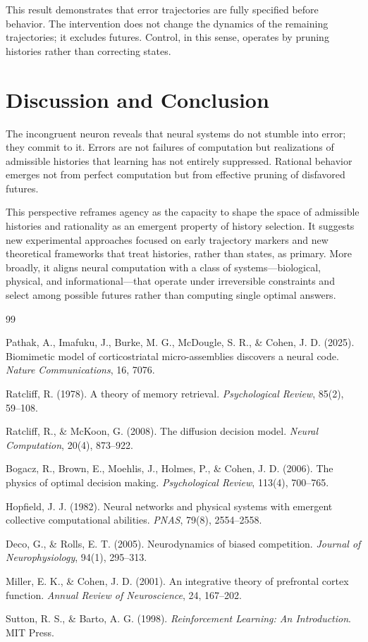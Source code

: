 \documentclass[11pt]{article}
\begin{document}
This result demonstrates that error trajectories are fully specified before behavior. The intervention does not change the dynamics of the remaining trajectories; it excludes futures. Control, in this sense, operates by pruning histories rather than correcting states.

\section{Discussion and Conclusion}

The incongruent neuron reveals that neural systems do not stumble into error; they commit to it. Errors are not failures of computation but realizations of admissible histories that learning has not entirely suppressed. Rational behavior emerges not from perfect computation but from effective pruning of disfavored futures.

This perspective reframes agency as the capacity to shape the space of admissible histories and rationality as an emergent property of history selection. It suggests new experimental approaches focused on early trajectory markers and new theoretical frameworks that treat histories, rather than states, as primary. More broadly, it aligns neural computation with a class of systems—biological, physical, and informational—that operate under irreversible constraints and select among possible futures rather than computing single optimal answers.

\begin{thebibliography}{99}

Pathak, A., Imafuku, J., Burke, M. G., McDougle, S. R., \& Cohen, J. D. (2025).
Biomimetic model of corticostriatal micro-assemblies discovers a neural code.
\emph{Nature Communications}, 16, 7076.

Ratcliff, R. (1978).
A theory of memory retrieval.
\emph{Psychological Review}, 85(2), 59--108.

Ratcliff, R., \& McKoon, G. (2008).
The diffusion decision model.
\emph{Neural Computation}, 20(4), 873--922.

Bogacz, R., Brown, E., Moehlis, J., Holmes, P., \& Cohen, J. D. (2006).
The physics of optimal decision making.
\emph{Psychological Review}, 113(4), 700--765.

Hopfield, J. J. (1982).
Neural networks and physical systems with emergent collective computational abilities.
\emph{PNAS}, 79(8), 2554--2558.

Deco, G., \& Rolls, E. T. (2005).
Neurodynamics of biased competition.
\emph{Journal of Neurophysiology}, 94(1), 295--313.

Miller, E. K., \& Cohen, J. D. (2001).
An integrative theory of prefrontal cortex function.
\emph{Annual Review of Neuroscience}, 24, 167--202.

Sutton, R. S., \& Barto, A. G. (1998).
\emph{Reinforcement Learning: An Introduction}.
MIT Press.

\end{thebibliography}
\end{document}
